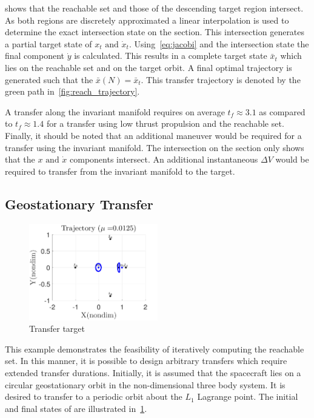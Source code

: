 \documentclass[preprint]{elsarticle}
\begin{document}
 shows that the reachable set and those of the descending target region intersect.
As both regions are discretely approximated a linear interpolation is used to determine the exact intersection state on the \Poincare section.
This intersection generates a partial target state of \( x_t \text{ and } \dot{x}_t \).
Using~\cref{eq:jacobi} and the intersection state the final component \( \dot{y} \) is calculated. 
This results in a complete target state \( \bar{x}_t \) which lies on the reachable set and on the target orbit. 
A final optimal trajectory is generated such that the \( \bar{x}(N) = \bar{x}_t \).
This transfer trajectory is denoted by the green path in~\cref{fig:reach_trajectory}.

A transfer along the invariant manifold requires on average \( t_f \approx 3.1 \) as compared to \( t_f \approx 1.4 \) for a transfer using low thrust propulsion and the reachable set.
Finally, it should be noted that an additional maneuver would be required for a transfer using the invariant manifold.
The intersection on the \Poincare section only shows that the \( x \text{ and } \dot{x} \) components intersect.
An additional instantaneous \( \Delta V \) would be required to transfer from the invariant manifold to the target.

\subsection{Geostationary Transfer}\label{sec:geo_transfer}
\begin{figure}[htbp]
   \centering
   \includegraphics[width=0.5\textwidth]{initial_final} %
   \caption{Transfer target}
   \label{fig:geo_transfer_target}
\end{figure}

This example demonstrates the feasibility of iteratively computing the reachable set. 
In this manner, it is possible to design arbitrary transfers which require extended transfer durations.
Initially, it is assumed that the spacecraft lies on a circular geostationary orbit in the non-dimensional three body system. 
It is desired to transfer to a periodic orbit about the \( L_1 \) Lagrange point. 
The initial and final states of are illustrated in~\cref{fig:geo_transfer_target}.
\end{document}
